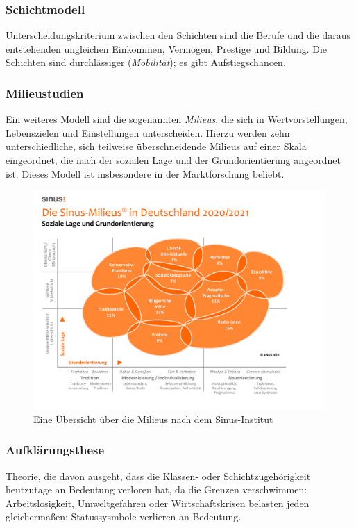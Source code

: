 \documentclass{article}
\begin{document}
	\subsubsection{Schichtmodell}
	Unterscheidungskriterium zwischen den Schichten sind die Berufe und die daraus entstehenden ungleichen Einkommen, Vermögen, Prestige und Bildung. Die Schichten sind durchlässiger (\textit{Mobilität}); es gibt Aufstiegschancen.

	\subsubsection{Milieustudien}
	Ein weiteres Modell sind die sogenannten \textit{Milieus}, die sich in Wertvorstellungen, Lebenszielen und Einstellungen unterscheiden. Hierzu werden zehn unterschiedliche, sich teilweise überschneidende Milieus auf einer Skala eingeordnet, die nach der sozialen Lage und der Grundorientierung angeordnet ist. Dieses Modell ist insbesondere in der Marktforschung beliebt.

	\begin{figure}[!ht]
		\centering
  		\includegraphics[width=30em]{milieus.png}
  		\caption{Eine Übersicht über die Milieus nach dem Sinus-Institut}
  		\label{fig:sinus_milieus}
	\end{figure}

	\subsubsection{Aufklärungsthese}
	Theorie, die davon ausgeht, dass die Klassen- oder Schichtzugehörigkeit heutzutage an Bedeutung verloren hat, da die Grenzen verschwimmen: Arbeitslosigkeit, Umweltgefahren oder Wirtschaftskrisen belasten jeden gleichermaßen; Statussysmbole verlieren an Bedeutung.
\end{document}
